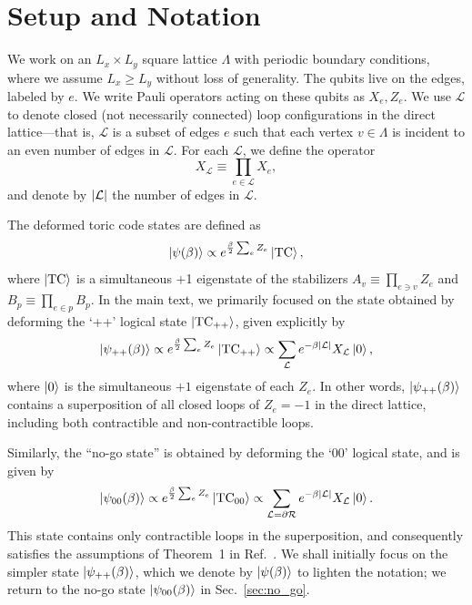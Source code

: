 \tableofcontents


\section{Setup and Notation}
We work on an $L_x \times L_y$ square lattice $\Lambda$ with periodic boundary conditions, where we assume $L_x\geq L_y$ without loss of generality. The qubits live on the edges, labeled by $e$. We write Pauli operators acting on these qubits as $X_e, Z_e$. We use $\mathcal{L}$ to denote closed (not necessarily connected) loop configurations in the direct lattice---that is, $\mathcal{L}$ is a subset of edges $e$ such that each vertex $v \in \Lambda$ is incident to an even number of edges in $\mathcal{L}$. For each $\mathcal{L}$, we define the operator
\begin{equation}
    X_{\mathcal{L}} \equiv \prod_{e\in {\mathcal{L}}} X_e,
\end{equation}
and denote by $\abs{\mathcal{L}}$ the number of edges in ${\mathcal{L}}$. 

The deformed toric code states are defined as
\begin{equation}
    \ket{\psi(\beta)} \propto e^{\frac{\beta}{2}\sum_e Z_e} \ket{\text{TC}} ,
\end{equation}
where $\ket{\text{TC}}$ is a simultaneous +1 eigenstate of the stabilizers $A_v \equiv \prod_{e \ni v} Z_e$ and $B_p \equiv \prod_{e \in p} B_p$. In the main text, we primarily focused on the state obtained by deforming the `++' logical state $\ket{\text{TC}_{++}}$, given explicitly by
\begin{equation}
\label{eq:psi_++}
    \ket{\psi_{++}(\beta)} \propto e^{\frac{\beta}{2}\sum_e Z_e} \ket{\text{TC}_{++}} \propto \sum_{\mathcal{L}} e^{-\beta \abs{\mathcal{L}}}X_{\mathcal{L}} \ket{0},
\end{equation}
where $\ket{0}$ is the simultaneous $+1$ eigenstate of each $Z_e$. In other words, $\ket{\psi_{++}(\beta)}$ contains a superposition of all closed loops of $Z_e = -1$ in the direct lattice, including both contractible and non-contractible loops.

Similarly, the ``no-go state'' is obtained by deforming the `00' logical state, and is given by
\begin{equation}
\label{eq:psi_00}
    \ket{\psi_{00}(\beta)} \propto e^{\frac{\beta}{2}\sum_e Z_e} \ket{\text{TC}_{00}} \propto \sum_{{\mathcal{L}} = \partial \mathcal{R} } e^{-\beta \abs{\mathcal{L}}}X_{\mathcal{L}} \ket{0} .
\end{equation}
This state contains only contractible loops in the superposition, and consequently satisfies the assumptions of Theorem~1 in Ref.~. We shall initially focus on the simpler state $\ket{\psi_{++}(\beta)}$, which we denote by $\ket{\psi(\beta)}$ to lighten the notation; we return to the no-go state $\ket{\psi_{00}(\beta)}$ in Sec.~\ref{sec:no_go}.

